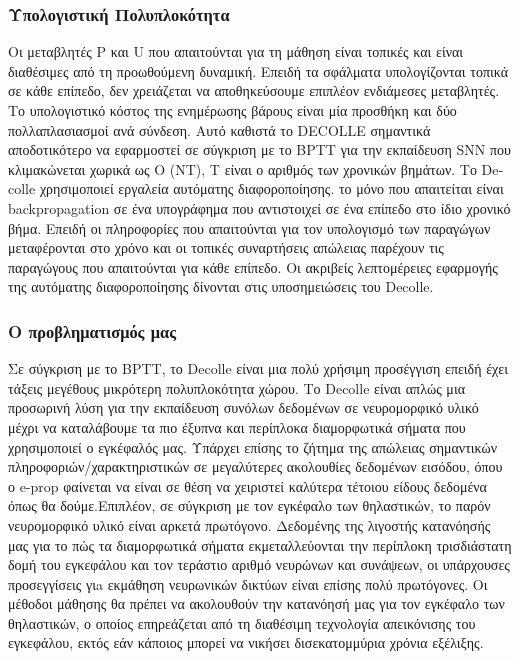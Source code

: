 \documentclass[12pt]{report}
\begin{document}
\subsubsection{Υπολογιστική Πολυπλοκότητα}
Οι μεταβλητές \textlatin{P} και \textlatin{U} που απαιτούνται για τη μάθηση είναι τοπικές και είναι διαθέσιμες από τη  προωθούμενη δυναμική. Επειδή τα σφάλματα υπολογίζονται τοπικά σε κάθε επίπεδο, δεν χρειάζεται να αποθηκεύσουμε επιπλέον ενδιάμεσες μεταβλητές. Το υπολογιστικό κόστος της ενημέρωσης βάρους είναι μία προσθήκη και δύο πολλαπλασιασμοί ανά σύνδεση. Αυτό καθιστά το \textlatin{DECOLLE} σημαντικά αποδοτικότερο να εφαρμοστεί σε σύγκριση με το \textlatin{BPTT} για την εκπαίδευση \textlatin{SNN } που κλιμακώνεται χωρικά ως O (NT), T είναι ο αριθμός των χρονικών βημάτων. Το \textlatin{Decolle} χρησιμοποιεί εργαλεία αυτόματης διαφοροποίησης. το μόνο που απαιτείται είναι \textlatin{backpropagation} σε ένα υπογράφημα που αντιστοιχεί σε ένα επίπεδο στο ίδιο χρονικό βήμα. Επειδή οι πληροφορίες που απαιτούνται για τον υπολογισμό των παραγώγων μεταφέρονται στο χρόνο και οι τοπικές συναρτήσεις απώλειας παρέχουν τις παραγώγους που απαιτούνται για κάθε επίπεδο. Οι ακριβείς λεπτομέρειες εφαρμογής της αυτόματης διαφοροποίησης δίνονται στις υποσημειώσεις του \textlatin{Decolle}.

\subsubsection{Ο προβληματισμός μας}
Σε σύγκριση με το \textlatin{BPTT}, το \textlatin{Decolle } είναι μια πολύ χρήσιμη προσέγγιση επειδή έχει τάξεις μεγέθους μικρότερη πολυπλοκότητα χώρου. Το \textlatin{Decolle} είναι απλώς μια προσωρινή λύση για την εκπαίδευση συνόλων δεδομένων σε νευρομορφικό υλικό μέχρι να καταλάβουμε τα πιο έξυπνα και περίπλοκα διαμορφωτικά σήματα που χρησιμοποιεί ο εγκέφαλός μας. Υπάρχει επίσης το ζήτημα της απώλειας σημαντικών πληροφοριών/χαρακτηριστικών σε μεγαλύτερες ακολουθίες δεδομένων εισόδου, όπου ο \textlatin{e-prop } φαίνεται να είναι σε θέση να χειριστεί καλύτερα τέτοιου είδους δεδομένα όπως θα δούμε.Επιπλέον, σε σύγκριση με τον εγκέφαλο των θηλαστικών, το παρόν νευρομορφικό υλικό είναι αρκετά πρωτόγονο. Δεδομένης της λιγοστής κατανόησής μας για το πώς τα διαμορφωτικά σήματα εκμεταλλεύονται την περίπλοκη τρισδιάστατη δομή του εγκεφάλου και τον τεράστιο αριθμό νευρώνων και συνάψεων, οι υπάρχουσες προσεγγίσεις γιa εκμάθηση νευρωνικών δικτύων είναι επίσης πολύ πρωτόγονες. Οι μέθοδοι μάθησης θα πρέπει να ακολουθούν την κατανόησή μας για τον εγκέφαλο των θηλαστικών, ο οποίος επηρεάζεται από τη διαθέσιμη τεχνολογία απεικόνισης του εγκεφάλου, εκτός εάν κάποιος μπορεί να νικήσει δισεκατομμύρια χρόνια εξέλιξης.
\end{document}
